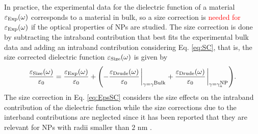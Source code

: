 In practice, the experimental data for the dielectric function of a material $\varepsilon_\text{\scriptsize Exp}(\omega)$ corresponds to a material in bulk, so a size  correction is \textcolor{red}{needed for} $\varepsilon_\text{\scriptsize Exp}(\omega)$ if the optical properties of NPs are studied. The size correction is done by subtracting the intraband  contribution that best fits the experimental bulk data and adding an intraband contribution considering Eq. \eqref{eq:SC}, that is, the size corrected dielectric function  $\varepsilon_\text{\scriptsize Size}(\omega)$ is given by
%
\begin{align}
\frac{\varepsilon_\text{\scriptsize Size}(\omega)}{\varepsilon_0} =
	\frac{\varepsilon_\text{\scriptsize Exp}(\omega)}{\varepsilon_0} +
 \qty(-
	 \frac{\varepsilon_\text{\scriptsize Drude}(\omega)}{\varepsilon_0}
	 									\eval_{\gamma = \gamma^\text{\scriptsize  Bulk}}
	 +
	 \frac{\varepsilon_\text{\scriptsize Drude}(\omega)}{\varepsilon_0}
 										\eval_{\gamma = \gamma^\text{\scriptsize  NP}_a} 	).
 \label{eq:EpsSC}
\end{align}
%
The size correction in Eq. \eqref{eq:EpsSC} considers the size effects on the intraband contribution of the dielectric function while the size corrections due to the interband contributions are neglected since it has been reported that they are relevant for NPs with radii smaller than $2$ nm \cite{mendoza_herrera_determination_2014}.

